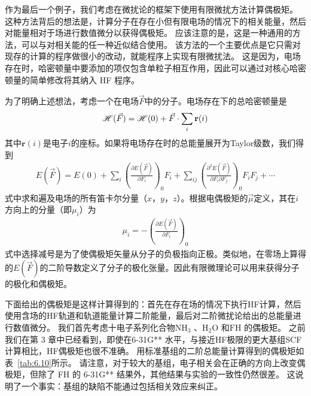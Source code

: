 作为最后一个例子，我们考虑在微扰论的框架下使用有限微扰方法计算偶极矩。 这种方法背后的想法是，计算分子在存在小但有限电场的情况下的相关能量，然后对能量相对于场进行数值微分以获得偶极矩。 应该注意的是，这是一种通用的方法，可以与对相关能的任一种近似结合使用。 该方法的一个主要优点是它只需对现存的计算的程序做很小的改动，就能程序上实现有限微扰法。 这是因为，电场存在时，哈密顿量中要添加的项仅包含单粒子相互作用，因此可以通过对核心哈密顿量的简单修改将其纳入 HF 程序。

为了明确上述想法，考虑一个在电场$\vec{F}$中的分子。电场存在下的总哈密顿量是
\begin{align}
	\mathscr{H}(\vec{F}) = \mathscr{H}(0) + \vec{F}\cdot \sum_i \mathbf{r}(i)
\end{align}
其中$\mathbf{r}(i)$是电子$i$的座标。如果将电场存在时的总能量展开为Taylor级数，我们得到
\begin{align}
	E(\vec{F}) = E(0) + \sum_i \left(\frac{\partial E(\vec{F})}{\partial F_i} \right)_0 F_i + \sum_{ij} \left(\frac{\partial^2 E(\vec{F})}{\partial F_i\partial F_j} \right)_0 F_iF_j + \cdots
\end{align}
式中求和遍及电场的所有笛卡尔分量（$x$，$y$，$z$）。根据电偶极矩的$\vec{\mu}$定义，其在$i$方向上的分量（即$\mu_i$）为
\begin{align}
	\mu_i = -\left(\frac{\partial E(\vec{F})}{\partial F_i}\right)_0
\end{align}
式中选择减号是为了使偶极矩矢量从分子的负极指向正极。类似地，在零场上算得的$E(\vec{F})$的二阶导数定义了分子的极化张量。因此有限微理论可以用来获得分子的极化和偶极矩。

下面给出的偶极矩是这样计算得到的：首先在存在场的情况下执行HF计算，然后使用含场的HF轨道和轨道能量计算二阶能量，最后对二阶微扰论给出的总能量进行数值微分。 我们首先考虑十电子系列化合物$\mathrm{NH_3}$ 、$\mathrm{H_2O}$ 和$\mathrm{FH}$ 的偶极矩。 之前我们在第 3 章中已经看到，即使在6-31G** 水平，与接近HF极限的更大基组SCF计算相比，HF偶极矩也很不准确。 用标准基组的二阶总能量计算得到的偶极矩如表~\autoref{tab:6.10}所示。 请注意，对于较大的基组，电子相关会在正确的方向上改变偶极矩，但除了 FH 的 6-31G** 结果外，其他结果与实验的一致性仍然很差。 这说明了一个事实：基组的缺陷不能通过包括相关效应来纠正。

